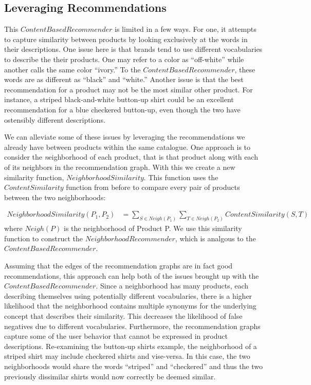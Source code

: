 \documentclass[11pt]{article}
\begin{document}
\subsection*{Leveraging Recommendations}
This $ContentBased Recommender$ is limited in a few ways. For one, it attempts
to capture similarity between products by looking exclusively at the words in
their descriptions. One issue here is that brands tend to use different 
vocabularies to describe the their products. One may refer to a color as 
``off-white'' while another calls the same color ``ivory.'' To the $ContentBased
Recommender$, these words are as different as ``black'' and ``white.'' Another 
issue is that the best recommendation for a product may not be the most similar
other product. For instance, a striped black-and-white button-up shirt could be 
an excellent recommendation for a blue checkered button-up, even though the two 
have ostensibly different descriptions.

We can alleviate some of these issues by leveraging the recommendations we
already have between products within the same catalogue. One approach is to 
consider the {\emph neighborhood} of each product, that is that product along 
with each of its neighbors in the recommendation graph. With this we create a
new similarity function, $NeighborhoodSimilarity$. This function uses the 
$ContentSimilarity$ function from before to compare every pair of products 
between the two neighborhoods:

\begin{align}
NeighborhoodSimilarity(P_1, P_2) &= \sum\limits_{S\in
Neigh(P_1)}\sum\limits_{T\in Neigh(P_2)}
ContentSimilarity(S, T) 
\end{align}
where $Neigh(P)$ is the neighborhood of Product P. We use this similarity
function to construct the $Neighborhood Recommender$, which is analgous to the
$ContentBased Recommender$.

Assuming that the edges of the recommendation graphs are in fact good
recommendations, this approach can help both of the issues brought up with the
$ContentBased Recommender$. Since a neighborhood has many products, each 
describing themselves using potentially different vocabularies, there is a 
higher likelihood that the neighborhood contains multiple synonyms for the
underlying concept that describes their similarity. This decreases the
likelihood of false negatives due to different vocabularies. Furthermore,
the recommendation graphs capture some of the user behavior that cannot be
expressed in product descriptions. Re-examining the button-up shirts example, 
the neighborhood of a striped shirt may include checkered shirts and vise-versa.
In this case, the two neighborhoods would share the words ``striped'' and 
``checkered'' and thus the two previously dissimilar shirts would now correctly
be deemed similar.
\end{document}
